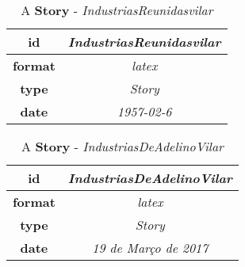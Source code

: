 \documentclass{article}
\begin{document}
    \begin{table}[ht!]
        \centering
        \begin{tabular}{|c|c|}
            \hline
            
                \textbf{ id } & \textit{ IndustriasReunidasvilar } \\
                \hline
            
                \textbf{ format } & \textit{ latex } \\
                \hline
            
                \textbf{ type } & \textit{ Story } \\
                \hline
            
                \textbf{ date } & \textit{ 1957-02-6 } \\
                \hline
            
        \end{tabular}
        \caption{A \textbf{ Story }-\textit{ IndustriasReunidasvilar }} %
        \label{table:\arabic{tablecounter2}} %
    \end{table}

    \begin{table}[ht!]
        \centering
        \begin{tabular}{|c|c|}
            \hline
            
                \textbf{ id } & \textit{ IndustriasDeAdelinoVilar } \\
                \hline
            
                \textbf{ format } & \textit{ latex } \\
                \hline
            
                \textbf{ type } & \textit{ Story } \\
                \hline
            
                \textbf{ date } & \textit{ 19 de Março de 2017 } \\
                \hline
            
        \end{tabular}
        \caption{A \textbf{ Story }-\textit{ IndustriasDeAdelinoVilar }} %
        \label{table:\arabic{tablecounter2}} %
    \end{table}
\end{document}
